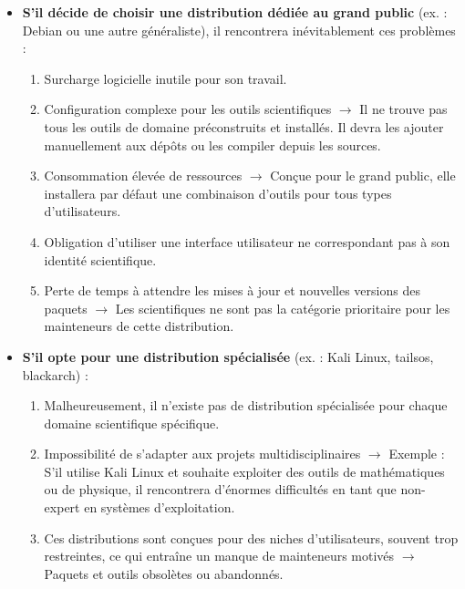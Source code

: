 \begin{itemize}[leftmargin=*,nosep]
\begin{itemize}
    \item \textbf{S’il décide de choisir une distribution dédiée au grand public} (ex. : Debian ou une autre généraliste), il rencontrera inévitablement ces problèmes :
    \begin{enumerate}[label=\Alph*)]
        \item Surcharge logicielle inutile pour son travail.
        \item Configuration complexe pour les outils scientifiques $\rightarrow$ Il ne trouve pas tous les outils de domaine préconstruits et installés. Il devra les ajouter manuellement aux dépôts ou les compiler depuis les sources.
        \item Consommation élevée de ressources $\rightarrow$ Conçue pour le grand public, elle installera par défaut une combinaison d’outils pour tous types d’utilisateurs.
        \item Obligation d’utiliser une interface utilisateur ne correspondant pas à son identité scientifique.
        \item Perte de temps à attendre les mises à jour et nouvelles versions des paquets $\rightarrow$ Les scientifiques ne sont pas la catégorie prioritaire pour les mainteneurs de cette distribution.\\
    \end{enumerate}
    
    \item \textbf{S’il opte pour une distribution spécialisée} (ex. : Kali Linux, tailsos, blackarch) :
    \begin{enumerate}[label=\Alph*)]
        \item Malheureusement, il n’existe pas de distribution spécialisée pour chaque domaine scientifique spécifique.
        \item Impossibilité de s’adapter aux projets multidisciplinaires $\rightarrow$ Exemple : S’il utilise Kali Linux et souhaite exploiter des outils de mathématiques ou de physique, il rencontrera d’énormes difficultés en tant que non-expert en systèmes d’exploitation.
        \item Ces distributions sont conçues pour des niches d’utilisateurs, souvent trop restreintes, ce qui entraîne un manque de mainteneurs motivés $\rightarrow$ Paquets et outils obsolètes ou abandonnés.
    \end{enumerate}
\end{itemize}




\end{itemize}

